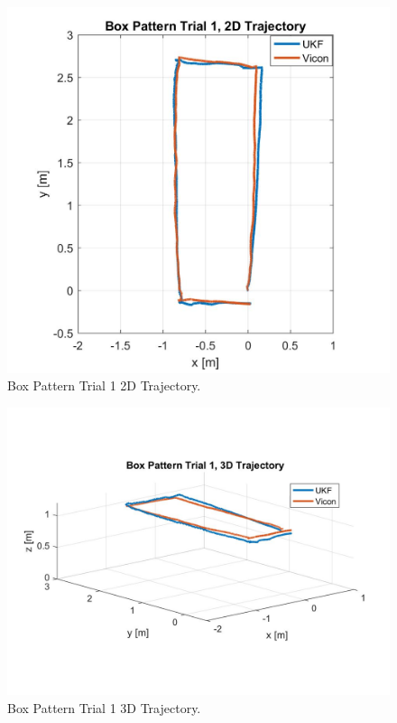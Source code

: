 \begin{figure}[p]
  \centering
    \includegraphics[height=0.6\textwidth]{box1_2d}
  \caption[Box Pattern Trial 1 2D Trajectory]{Box Pattern Trial 1 2D Trajectory.}
  \label{fig:box1_2d}
\end{figure}
\begin{figure}[p]
  \centering
    \includegraphics[height=0.7\textwidth]{box1_3d}
  \caption[Box Pattern Trial 1 3D Trajectory]{Box Pattern Trial 1 3D Trajectory.}
  \label{fig:box1_3d}
\end{figure}
\clearpage

